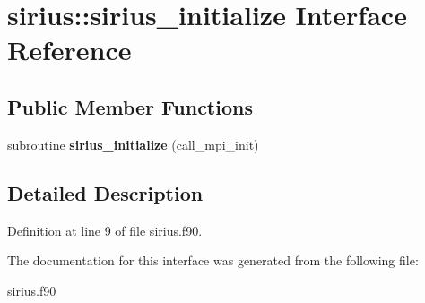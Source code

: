 \hypertarget{interfacesirius_1_1sirius__initialize}{}\section{sirius\+:\+:sirius\+\_\+initialize Interface Reference}
\label{interfacesirius_1_1sirius__initialize}
\subsection*{Public Member Functions}
\begin{DoxyCompactItemize}
\item 
\hypertarget{interfacesirius_1_1sirius__initialize_afe115ae27053bdeab4c86816b69dae2e}{}subroutine {\bfseries sirius\+\_\+initialize} (call\+\_\+mpi\+\_\+init)\label{interfacesirius_1_1sirius__initialize_afe115ae27053bdeab4c86816b69dae2e}

\end{DoxyCompactItemize}


\subsection{Detailed Description}


Definition at line 9 of file sirius.\+f90.



The documentation for this interface was generated from the following file\+:\begin{DoxyCompactItemize}
\item 
sirius.\+f90\end{DoxyCompactItemize}
